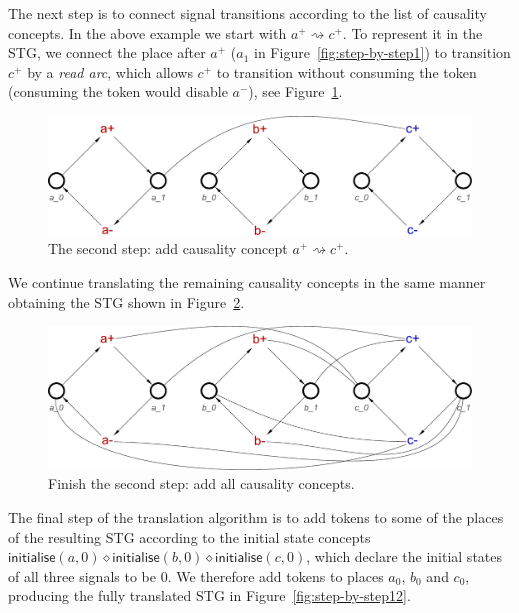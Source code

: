 \documentclass[british,compsoc]{IEEEtran}
\begin{document}
The next step is to connect signal transitions according to the list of causality
concepts. In the above example we start with $a^{+}\rightsquigarrow c^{+}$.
To represent it in the STG, we connect the place after $a^{+}$ ($a_1$ in
Figure~\ref{fig:step-by-step1}) to transition $c^{+}$ by a \emph{read arc},
which allows $c^{+}$ to transition without consuming the token (consuming
the token would disable $a^{-}$), see Figure~\ref{fig:step-by-step2}.

\begin{figure}[h]
\begin{centering}
\includegraphics[scale=0.23]{Images/Step-by-step2}
\par
\protect\caption{\label{fig:step-by-step2}The second step: add causality concept $a^{+}\rightsquigarrow c^{+}$.}
\vspace{-2mm}
\end{centering}
\end{figure}

We continue translating the remaining causality concepts in the same manner
obtaining the STG shown in Figure~\ref{fig:step-by-step9}.

\begin{figure}[h]
\begin{centering}
\includegraphics[scale=0.23]{Images/Step-by-step9}
\par
\protect\caption{\label{fig:step-by-step9}Finish the second step: add all causality concepts.}
\par\end{centering}
\end{figure}

The final step of the translation algorithm is to add tokens to some of the places
of the resulting STG according to the initial state concepts
$\mathsf{initialise}(a,0) \diamond \mathsf{initialise}(b,0) \diamond \mathsf{initialise}(c,0)$, which declare the initial states of all three signals to be 0. We therefore
add tokens to places $a_0$, $b_0$ and $c_0$, producing the fully translated STG in
Figure~\ref{fig:step-by-step12}.
\end{document}
